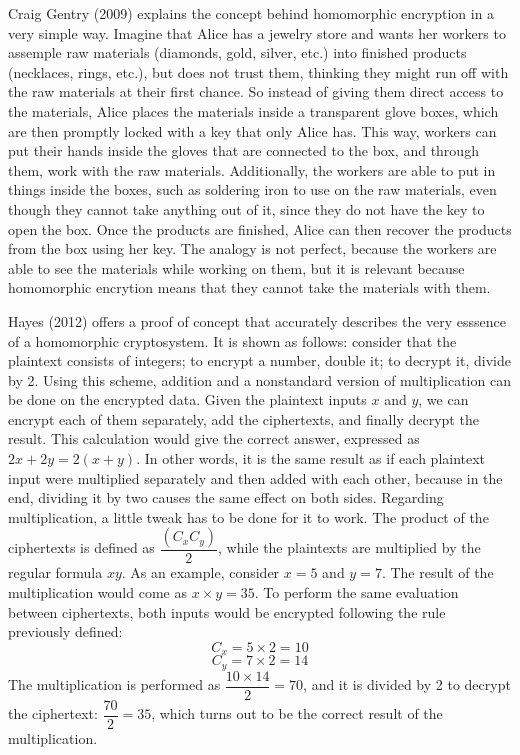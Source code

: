 Craig Gentry (2009) \cite{homoenc} explains the concept behind homomorphic encryption in a very simple way. Imagine that Alice has a jewelry store and wants her workers to assemple raw materials (diamonds, gold, silver, etc.) into finished products (necklaces, rings, etc.), but does not trust them, thinking they might run off with the raw materials at their first chance. So instead of giving them direct access to the materials, Alice places the materials inside a transparent glove boxes, which are then promptly locked with a key that only Alice has. This way, workers can put their hands inside the gloves that are connected to the box, and through them, work with the raw materials. Additionally, the workers are able to put in things inside the boxes, such as soldering iron to use on the raw materials, even though they cannot take anything out of it, since they do not have the key to open the box. Once the products are finished, Alice can then recover the products from the box using her key. The analogy is not perfect, because the workers are able to see the materials while working on them, but it is relevant because homomorphic encrytion means that they cannot take the materials with them.

Hayes (2012) \cite{Hayes2012} offers a proof of concept that accurately describes the very esssence of a homomorphic cryptosystem. It is shown as follows: consider that the plaintext consists of integers; to encrypt a number, double it; to decrypt it, divide by 2. Using this scheme, addition and a nonstandard version of multiplication can be done on the encrypted data. Given the plaintext inputs $x$ and $y$, we can encrypt each of them separately, add the ciphertexts, and finally decrypt the result. This calculation would give the correct answer, expressed as $2x+2y=2(x+y)$. In other words, it is the same result as if each plaintext input were multiplied separately and then added with each other, because in the end, dividing it by two causes the same effect on both sides. 
Regarding multiplication, a little tweak has to be done for it to work. The product of the ciphertexts is defined as $\dfrac{(C_{x} C_{y})}{2}$, while the plaintexts are multiplied by the regular formula $xy$. 
As an example, consider $x=5$ and $y=7$. The result of the multiplication would come as $x \times y = 35$. To perform the same evaluation between ciphertexts, both inputs would be encrypted following the rule previously defined:
\[
C_{x} = 5 \times 2 = 10
\]
\[
C_{y} = 7 \times 2 = 14
\]
The multiplication is performed as $\dfrac{10 \times 14}{2} = 70$, and it is divided by 2 to decrypt the ciphertext: $\dfrac{70}{2} = 35$, which turns out to be the correct result of the multiplication.

